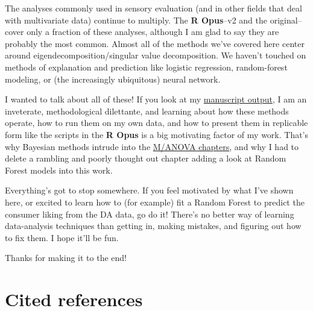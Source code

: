 \documentclass[
]{book}
\begin{document}
The analyses commonly used in sensory evaluation (and in other fields that deal with multivariate data) continue to multiply. The \textbf{R Opus}--v2 and the original--cover only a fraction of these analyses, although I am glad to say they are probably the most common. Almost all of the methods we've covered here center around eigendecomposition/singular value decomposition. We haven't touched on methods of explanation and prediction like logistic regression, random-forest modeling, or (the increasingly ubiquitous) neural network.

I wanted to talk about all of these! If you look at my \href{https://scholar.google.com/citations?user=f-3bd00AAAAJ&hl=en}{manuscript output}, I am an inveterate, methodological dilettante, and learning about how these methods operate, how to run them on my own data, and how to present them in replicable form like the scripts in the \textbf{R Opus} is a big motivating factor of my work. That's why Bayesian methods intrude into the \hyperref[analysis-of-variance]{M/ANOVA chapters}, and why I had to delete a rambling and poorly thought out chapter adding a look at Random Forest models into this work.

Everything's got to stop somewhere. If you feel motivated by what I've shown here, or excited to learn how to (for example) fit a Random Forest to predict the consumer liking from the DA data, go do it! There's no better way of learning data-analysis techniques than getting in, making mistakes, and figuring out how to fix them. I hope it'll be fun.

Thanks for making it to the end!

\section{Cited references}\label{cited-references}


\end{document}
